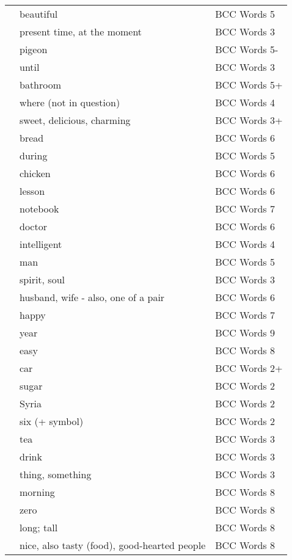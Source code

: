 \documentclass[10pt,twocolumn]{article}
\begin{document}
\begin{supertabular*}{\linewidth}{p{0.1\textwidth}p{0.2\textwidth}>{\footnotesize}p{0.2\textwidth}}
 & beautiful & BCC Words 5 \\
 & present time, at the moment & BCC Words 3 \\
 & pigeon & BCC Words 5- \\
 & until & BCC Words 3 \\
 & bathroom & BCC Words 5+ \\
 & where (not in question) & BCC Words 4 \\
 & sweet, delicious, charming & BCC Words 3+ \\
 & bread & BCC Words 6 \\
 & during & BCC Words 5 \\
 & chicken & BCC Words 6 \\
 & lesson & BCC Words 6 \\
 & notebook & BCC Words 7 \\
 & doctor & BCC Words 6 \\
 & intelligent & BCC Words 4 \\
 & man & BCC Words 5 \\
 & spirit, soul & BCC Words 3 \\
 & husband, wife - also, one of a pair & BCC Words 6 \\
 & happy & BCC Words 7 \\
 & year & BCC Words 9 \\
 & easy & BCC Words 8 \\
 & car & BCC Words 2+ \\
 & sugar & BCC Words 2 \\
 & Syria & BCC Words 2 \\
 & six (+ symbol) & BCC Words 2 \\
 & tea & BCC Words 3 \\
 & drink & BCC Words 3 \\
 & thing, something & BCC Words 3 \\
 & morning & BCC Words 8 \\
 & zero & BCC Words 8 \\
 & long; tall & BCC Words 8 \\
 & nice, also tasty (food), good-hearted people & BCC Words 8 \\

\end{supertabular*}
\end{document}
